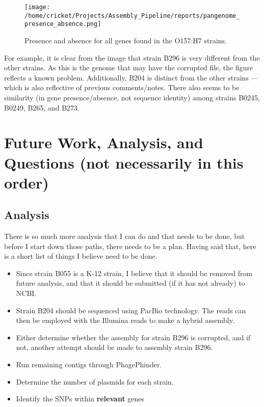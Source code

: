\documentclass[11pt]{article}
\begin{document}
\begin{figure}[ht!]\normalsize %
\centering
\texttt{[image: /home/cricket/Projects/Assembly\_Pipeline/reports/pangenome\_presence\_absence.png]}
\caption{Presence and absence for all genes found in the O157:H7 strains.}
\label{presence_absence}
\end{figure}

For example, it is clear from the image that strain B296 is very different from the other strains. As this is the genome that may have the corrupted file, the figure reflects a known problem. Additionally, B204 is distinct from the other strains --- which is also reflective of previous comments/notes. There also seems to be similarity (in gene presence/absence, not sequence identity) among strains B0245, B0249, B265, and B273.

\section*{Future Work, Analysis, and Questions (not necessarily in this order)}

\subsection*{Analysis}
There is so much more analysis that I can do and that needs to be done, but before I start down those paths, there needs to be a plan. Having said that, here is a short list of things I believe need to be done.
\begin{itemize}
\item Since strain B055 is a K-12 strain, I believe that it should be removed from future analysis, and that it should be submitted (if it has not already) to NCBI. 
\item Strain B204 should be sequenced using PacBio technology. The reads can then be employed with the Illumina reads to make a hybrid assembly.
\item Either determine whether the assembly for strain B296 is corrupted, and if not, another attempt should be made to assembly strain B296.
\item Run remaining contigs through PhagePhinder.
\item Determine the number of plasmids for each strain.
\item Identify the SNPs within \textbf{relevant} genes
\end{itemize}
\end{document}
